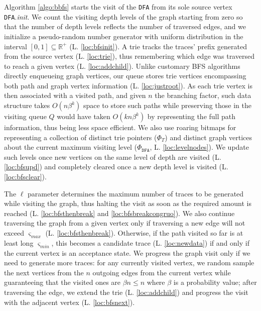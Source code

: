 \documentclass[sigconf]{acmart}
\newcommand{\smin}{\ensuremath{\varsigma_\textit{min}}}
\newcommand{\smax}{\ensuremath{\varsigma_\textit{max}}}
\begin{document}
Algorithm \ref{algo:bbfs} starts the visit of the \texttt{DFA} from its sole source vertex \texttt{DFA}.\textit{init}. We count the visiting depth levels of the graph starting from zero so that the number of depth levels reflects the number of traversed edges, and we initialize a pseudo-random number generator with uniform distribution in the interval $[0,1 ]\subseteq\mathbb{R}^+$ (L. \ref{loc:bfsinit}). A trie tracks the traces' prefix  generated from the source vertex (L. \ref{loc:trie}), thus remembering which edge was traversed to reach a given vertex (L. \ref{loc:addchild}). Unlike customary BFS algorithms directly enqueueing graph vertices, our queue  stores trie vertices encompassing both path and graph vertex information (L. \ref{loc:justroot}). As each trie vertex is then associated with a visited path, and given $n$ the branching factor, such data structure takes $O(n\beta^k)$ space to store such paths while preserving those in the visiting queue $Q$ would have taken $O(kn\beta^k)$ by representing the full path information, thus being less space efficient. We also use roaring bitmaps \cite{WangLPS17} for representing a collection of distinct trie pointers ($\Phi_T$) and distinct graph vertices about the current maximum visiting level ($\Phi_\texttt{DFA}$, L. \ref{loc:levelnodes}). We update such levels once new vertices on the same level of depth are visited (L. \ref{loc:bfsupd}) and completely cleared once a new depth level is visited (L. \ref{loc:bfsclear}). 

The $\ell$ parameter determines the maximum number of traces to be generated while visiting the graph, thus halting the visit as soon as the required amount is reached (L. \ref{loc:bfsthenbreak} and \ref{loc:bfsbreakcongruo}). We also continue traversing the graph from a given vertex only if traversing a new edge will not exceed $\smax$ (L. \ref{loc:bfsthenbreak}). Otherwise, if the path visited so far is at least long $\smin$, this becomes a candidate trace (L. \ref{loc:newdata}) if and only if the current vertex is an acceptance state. We progress the graph visit only if we need to generate more traces: for any currently visited vertex, we random sample the next vertices from the $n$ outgoing edges from the current vertex while guaranteeing that the visited ones are $\beta n\leq n$ where $\beta$ is a probability value; after traversing the edge, we extend the trie (L. \ref{loc:addchild}) and progress the visit with the adjacent vertex (L. \ref{loc:bfsnext}). 
\end{document}
